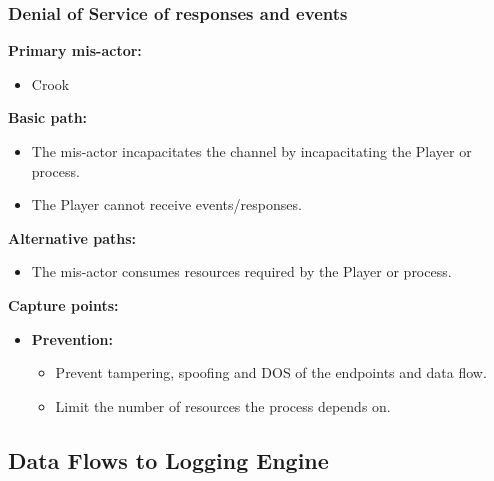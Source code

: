 \documentclass[a4paper,11pt]{report}
\begin{document}
\subsubsection{Denial of Service of responses and events}
\textbf{Primary mis-actor:}
\begin{itemize}
\item Crook
\end{itemize}
\textbf{Basic path:}
\begin{itemize}
\item The mis-actor incapacitates the channel by incapacitating the Player or process.
\item The Player cannot receive events/responses.
\end{itemize}
\textbf{Alternative paths:}
\begin{itemize}
\item The mis-actor consumes resources required by the Player or process.
\end{itemize}
\textbf{Capture points:}
\begin{itemize}
\item \textbf{Prevention:}
\begin{itemize}
\item Prevent tampering, spoofing and DOS of the endpoints and data flow.
\item Limit the number of resources the process depends on.
\end{itemize}
\end{itemize}

\subsection{Data Flows to Logging Engine}
\end{document}
